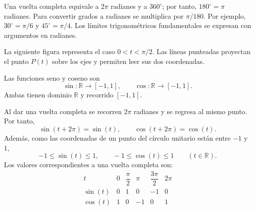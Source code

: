 \documentclass[10pt,a5paper]{article}
\begin{document}
Una vuelta completa equivale a $2\pi$ radianes y a $360^\circ$; por tanto, $180^\circ=\pi$ radianes. Para convertir grados a radianes se multiplica por $\pi/180$. Por ejemplo, $30^\circ=\pi/6$ y $45^\circ=\pi/4$. Los límites trigonométricos fundamentales se expresan con argumentos en radianes.

La siguiente figura representa el caso $0<t<\pi/2$. Las líneas punteadas proyectan el punto $P(t)$ sobre los ejes y permiten leer sus dos coordenadas.
\begin{center}
\end{center}

\begin{definicion}
Las funciones seno y coseno son
\[
  \sin\colon\mathbb{R}\longrightarrow[-1,1],
  \qquad
  \cos\colon\mathbb{R}\longrightarrow[-1,1].
\]
Ambas tienen dominio $\mathbb{R}$ y recorrido $[-1,1]$.
\end{definicion}

Al dar una vuelta completa se recorren $2\pi$ radianes y se regresa al mismo punto. Por tanto,
\[
  \sin(t+2\pi)=\sin(t),
  \qquad
  \cos(t+2\pi)=\cos(t).
\]
Además, como las coordenadas de un punto del círculo unitario están entre $-1$ y $1$,
\[
  -1\leq\sin(t)\leq1,
  \qquad
  -1\leq\cos(t)\leq1
  \qquad (t\in\mathbb{R}).
\]
Los valores correspondientes a una vuelta completa son:
\[
\begin{array}{c|ccccc}
  t & 0 & \dfrac{\pi}{2} & \pi & \dfrac{3\pi}{2} & 2\pi \\ \hline
  \sin(t) & 0 & 1 & 0 & -1 & 0 \\
  \cos(t) & 1 & 0 & -1 & 0 & 1
\end{array}
\]
\end{document}
